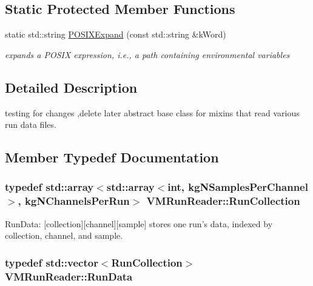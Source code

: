 \subsection*{Static Protected Member Functions}
\begin{DoxyCompactItemize}
\item 
static std\+::string \hyperlink{class_v_m_run_reader_aa073a42cf6eadf42fd9937d8c8f24dae}{P\+O\+S\+I\+X\+Expand} (const std\+::string \&k\+Word)
\begin{DoxyCompactList}\small\item\em expands a P\+O\+S\+I\+X expression, i.\+e., a path containing environmental variables \end{DoxyCompactList}\end{DoxyCompactItemize}


\subsection{Detailed Description}
testing for changes ,delete later abstract base class for mixins that read various run data files. 

\subsection{Member Typedef Documentation}
\hypertarget{class_v_m_run_reader_aca02fe95a36b6651ad0cf4bc7a8d02e4}{
\subsubsection[{Run\+Collection}]{\setlength{\rightskip}{0pt plus 5cm}typedef std\+::array$<$std\+::array$<$int, kg\+N\+Samples\+Per\+Channel$>$, kg\+N\+Channels\+Per\+Run$>$ {\bf V\+M\+Run\+Reader\+::\+Run\+Collection}\hspace{0.3cm}{\ttfamily [protected]}}}\label{class_v_m_run_reader_aca02fe95a36b6651ad0cf4bc7a8d02e4}
Run\+Data\+: \mbox{[}collection\mbox{]}\mbox{[}channel\mbox{]}\mbox{[}sample\mbox{]} stores one run's data, indexed by collection, channel, and sample. \hypertarget{class_v_m_run_reader_aa84c99e50235a10f563b3487b3930602}{
\subsubsection[{Run\+Data}]{\setlength{\rightskip}{0pt plus 5cm}typedef std\+::vector$<${\bf Run\+Collection}$>$ {\bf V\+M\+Run\+Reader\+::\+Run\+Data}\hspace{0.3cm}{\ttfamily [protected]}}}\label{class_v_m_run_reader_aa84c99e50235a10f563b3487b3930602}


